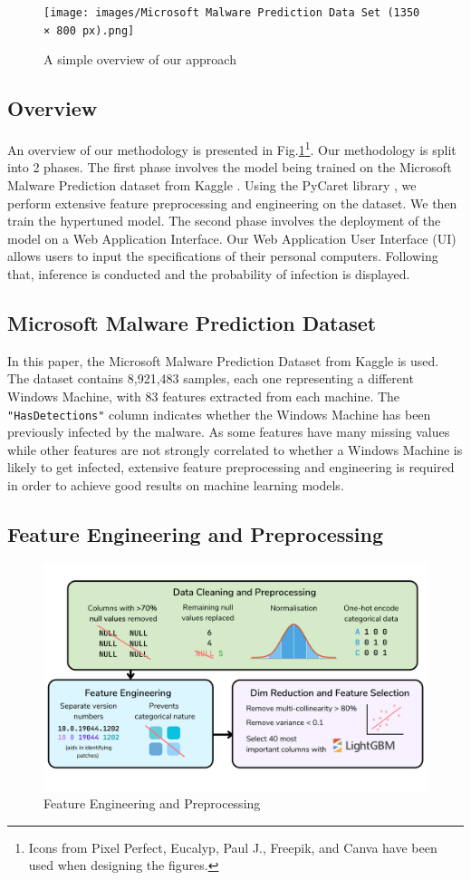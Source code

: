 \documentclass[runningheads]{llncs}
\begin{document}
\begin{figure}[h]
\texttt{[image: images/Microsoft Malware Prediction Data Set (1350 × 800 px).png]}
\centering
\caption{A simple overview of our approach}
\label{Fig 1}
\end{figure}

\subsection{Overview}
An overview of our methodology is presented in Fig.\ref{Fig 1}\footnote[1]{Icons from Pixel Perfect, Eucalyp, Paul J., Freepik, and Canva have been used when designing the figures.}. Our methodology is split into 2 phases. The first phase involves the model being trained on the Microsoft Malware Prediction dataset from Kaggle \cite{microsoft-malware-prediction}. Using the PyCaret library \cite{pycaret}, we perform extensive feature preprocessing and engineering on the dataset. We then train the hypertuned model. The second phase involves the deployment of the model on a Web Application Interface. Our Web Application User Interface (UI) allows users to input the specifications of their personal computers. Following that, inference is conducted and the probability of infection is displayed.
\subsection{Microsoft Malware Prediction Dataset}
In this paper, the Microsoft Malware Prediction Dataset from Kaggle \cite{microsoft-malware-prediction} is used. The dataset contains 8,921,483 samples, each one representing a different Windows Machine, with 83 features extracted from each machine. The \texttt{"HasDetections"} column indicates whether the Windows Machine has been previously infected by the malware. As some features have many missing values while other features are not strongly correlated to whether a Windows Machine is likely to get infected, extensive feature preprocessing and engineering is required in order to achieve good results on machine learning models. 
\subsection{Feature Engineering and Preprocessing}
\begin{figure}[h]
\includegraphics[scale=0.25]{images/feature_engineering.png}
\centering
\caption{Feature Engineering and Preprocessing}
\label{Fig 2}
\end{figure}
\end{document}
